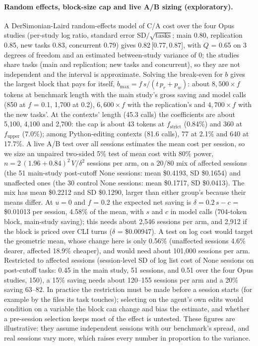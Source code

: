 \documentclass[11pt]{article}
\newcommand{\ci}[2]{\,[#1,\,#2]}
\newcommand{\aNone}{\textsf{None}\xspace}
\begin{document}
\paragraph{Random effects, block-size cap and live A/B sizing (exploratory).}
A DerSimonian-Laird random-effects model of C/A cost over the four Opus studies (per-study log ratio, standard error SD$/\sqrt{\text{tasks}}$; main 0.80, replication 0.85, new tasks 0.83, concurrent 0.79) gives 0.82\ci{0.77}{0.87}, with $Q$ = 0.65 on 3 degrees of freedom and an estimated between-study variance of 0; the studies share tasks (main and replication; new tasks and concurrent), so they are not independent and the interval is approximate.
Solving the break-even for $b$ gives the largest block that pays for itself, $b_{\max} = f\,s/(t\,p_r + p_w)$: about $8{,}500 \times f$ tokens at benchmark length with the main study's gross saving and model calls (850 at $f$ = 0.1, 1,700 at 0.2), $6{,}600 \times f$ with the replication's and $4{,}700 \times f$ with the new tasks'. At the contexts' length (45.3 calls) the coefficients are about 5,100, 4,100 and 2,700: the cap is about 43 tokens at $f_\text{strict}$ (0.84\%) and 360 at $f_\text{upper}$ (7.0\%); among Python-editing contexts (81.6 calls), 77 at 2.1\% and 640 at 17.7\%.
A live A/B test over all sessions estimates the mean cost per session, so we size an unpaired two-sided 5\% test of mean cost with 80\% power, $n = 2\,(1.96 + 0.84)^2\,V/\delta^2$ sessions per arm, on a 20/80 mix of affected sessions (the 51 main-study post-cutoff \aNone sessions: mean \$0.4193, SD \$0.1654) and unaffected ones (the 30 control \aNone sessions: mean \$0.1717, SD \$0.0413). The mix has mean \$0.2212 and SD \$0.1290, larger than either group's because their means differ.
At $u = 0$ and $f$ = 0.2 the expected net saving is $\delta = 0.2\,s - c$ = \$0.01013 per session, 4.58\% of the mean, with $s$ and $c$ in model calls (704-token block, main-study saving); this needs about 2,546 sessions per arm, and 2,912 if the block is priced over CLI turns ($\delta$ = \$0.00947). A test on log cost would target the geometric mean, whose change here is only 0.56\% (unaffected sessions 4.6\% dearer, affected 18.9\% cheaper), and would need about 101,000 sessions per arm.
Restricted to affected sessions (session-level SD of log list cost of \aNone sessions on post-cutoff tasks: 0.45 in the main study, 51 sessions, and 0.51 over the four Opus studies, 150), a 15\% saving needs about 120--155 sessions per arm and a 20\% saving 63--82. In practice the restriction must be made before a session starts (for example by the files its task touches); selecting on the agent's own edits would condition on a variable the block can change and bias the estimate, and whether a pre-session selection keeps most of the effect is untested.
These figures are illustrative: they assume independent sessions with our benchmark's spread, and real sessions vary more, which raises every number in proportion to the variance.
\end{document}
